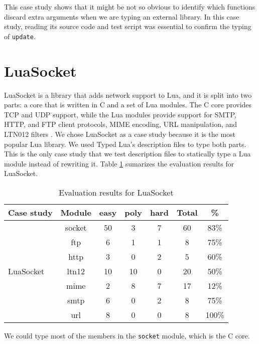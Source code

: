 This case study shows that it might be not so obvious to identify which
functions discard extra arguments when we are typing an external library.
In this case study, reading its source code and test script was essential
to confirm the typing of \texttt{update}.

\section{LuaSocket}

LuaSocket \citep{luasocket} is a library that adds network support to Lua,
and it is split into two parts: a core that is written in C and a set of
Lua modules.
The C core provides TCP and UDP support, while the Lua modules provide
support for SMTP, HTTP, and FTP client protocols, MIME encoding,
URL manipulation, and LTN012 filters \citep{nehab2008ltn012}.
We chose LuaSocket as a case study because it is the most popular Lua library.
We used Typed Lua's description files to type both parts.
This is the only case study that we test description files to statically type
a Lua module instead of rewriting it.
Table \ref{tab:evalsocket} sumarizes the evaluation results for LuaSocket.

\begin{table}[!ht]
\begin{center}
\begin{tabular}{|l|c|c|c|c|c|c|}
\hline
\textbf{Case study} & \textbf{Module} & \textbf{easy} & \textbf{poly} & \textbf{hard} & \textbf{Total} & \textbf{\%} \\
\hline
\multirow{7}{*}{LuaSocket}
& socket & 50 & 3 & 7 & 60 & 83\% \\
\cline{2-7}
& ftp & 6 & 1 & 1 & 8 & 75\% \\
\cline{2-7}
& http & 3 & 0 & 2 & 5 & 60\% \\
\cline{2-7}
& ltn12 & 10 & 10 & 0 & 20 & 50\% \\
\cline{2-7}
& mime & 2 & 8 & 7 & 17 & 12\% \\
\cline{2-7}
& smtp & 6 & 0 & 2 & 8 & 75\% \\
\cline{2-7}
& url & 8 & 0 & 0 & 8 & 100\% \\
\hline
\end{tabular}
\end{center}
\caption{Evaluation results for LuaSocket}
\label{tab:evalsocket}
\end{table}

We could type most of the members in the \texttt{socket} module,
which is the C core.

